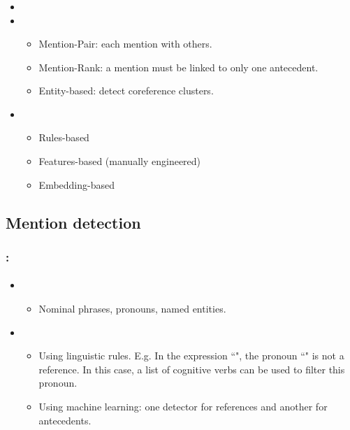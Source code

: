 \documentclass[xcolor=table]{beamer}
\begin{document}
\begin{frame}
	\frametitle{\insertshortsubtitle}
	\framesubtitle{\insertsection}
	
	
	\begin{itemize}
		\item {}
		\item {}
		\begin{itemize}
			\item Mention-Pair: each mention with others.
			\item Mention-Rank: a mention must be linked to only one antecedent.
			\item Entity-based: detect coreference clusters.
		\end{itemize}
		
		\item {}
		\begin{itemize}
			\item Rules-based
			\item Features-based (manually engineered)
			\item Embedding-based
		\end{itemize}
	\end{itemize}
	
\end{frame}


\subsection{Mention detection}

\begin{frame}
	\frametitle{\insertshortsubtitle: \insertsection}
	\framesubtitle{\insertsubsection}
	
	\begin{itemize}
		\item {}
		\begin{itemize}
			\item Nominal phrases, pronouns, named entities.
		\end{itemize}
	
		\item {}
		\begin{itemize}
			\item Using linguistic rules. E.g. In the expression ``", the pronoun ``" is not a reference. In this case, a list of cognitive verbs  can be used to filter this pronoun.
			\item Using machine learning: one detector for references and another for antecedents.
		\end{itemize}
	
	\end{itemize}
	
\end{frame}
\end{document}
